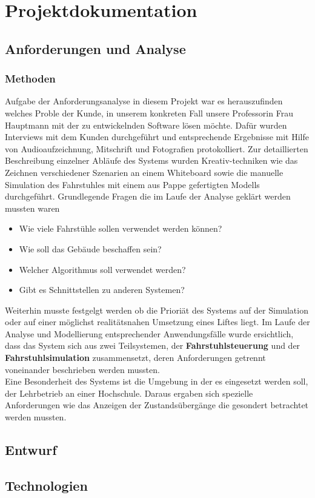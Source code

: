 \part{Projektdokumentation}
\chapter{Anforderungen und Analyse}
\section{Methoden}
Aufgabe der Anforderungsanalyse in diesem Projekt war es herauszufinden welches Proble der Kunde, in unserem konkreten Fall unsere Professorin Frau Hauptmann mit der zu entwickelnden Software lösen möchte. Dafür wurden Interviews mit dem Kunden durchgeführt und entsprechende Ergebnisse mit Hilfe von Audioaufzeichnung, Mitschrift und Fotografien protokolliert. Zur detaillierten Beschreibung einzelner Abläufe des Systems wurden Kreativ-techniken wie das Zeichnen verschiedener Szenarien an einem Whiteboard sowie die manuelle Simulation des Fahrstuhles mit einem aus Pappe gefertigten Modells durchgeführt.
Grundlegende Fragen die im Laufe der Analyse geklärt werden mussten waren
\begin{itemize}
	\item Wie viele Fahrstühle sollen verwendet werden können?
	\item Wie soll das Gebäude beschaffen sein?
	\item Welcher Algorithmus soll verwendet werden?
	\item Gibt es Schnittstellen zu anderen Systemen?
\end{itemize}
Weiterhin musste festgelgt werden ob die Prioriät des Systems auf der Simulation oder auf einer möglichst realitätsnahen Umsetzung eines Liftes liegt.
Im Laufe der Analyse und Modellierung entsprechender Anwendungsfälle wurde ersichtlich, dass das System sich aus zwei Teilsystemen, der \textbf{Fahrstuhlsteuerung} und der \textbf{Fahrstuhlsimulation} zusammensetzt, deren Anforderungen getrennt voneinander beschrieben werden mussten.\\
Eine Besonderheit des Systems ist die Umgebung in der es eingesetzt werden soll, der Lehrbetrieb an einer Hochschule. Daraus ergaben sich spezielle Anforderungen wie das Anzeigen der Zustandsübergänge die gesondert betrachtet werden mussten.
\chapter{Entwurf}
\chapter{Technologien}
